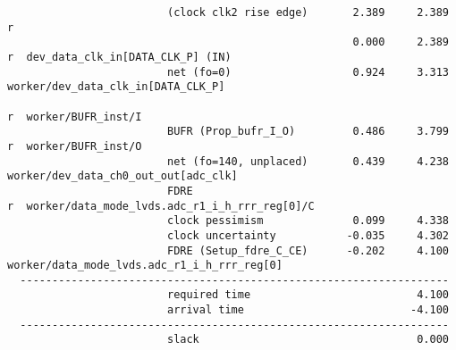 \documentclass{article}
\begin{document}
\begin{lstlisting}
                         (clock clk2 rise edge)       2.389     2.389 r  
                                                      0.000     2.389 r  dev_data_clk_in[DATA_CLK_P] (IN)
                         net (fo=0)                   0.924     3.313    worker/dev_data_clk_in[DATA_CLK_P]
                                                                      r  worker/BUFR_inst/I
                         BUFR (Prop_bufr_I_O)         0.486     3.799 r  worker/BUFR_inst/O
                         net (fo=140, unplaced)       0.439     4.238    worker/dev_data_ch0_out_out[adc_clk]
                         FDRE                                         r  worker/data_mode_lvds.adc_r1_i_h_rrr_reg[0]/C
                         clock pessimism              0.099     4.338    
                         clock uncertainty           -0.035     4.302    
                         FDRE (Setup_fdre_C_CE)      -0.202     4.100    worker/data_mode_lvds.adc_r1_i_h_rrr_reg[0]
  -------------------------------------------------------------------
                         required time                          4.100    
                         arrival time                          -4.100    
  -------------------------------------------------------------------
                         slack                                  0.000    




\end{lstlisting}
\end{document}

